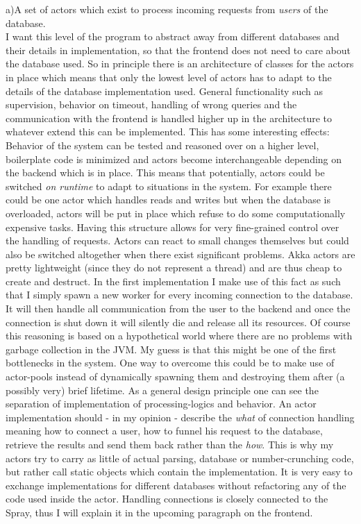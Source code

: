 \documentclass[11p]{scrartcl}
\begin{document}
a)A set of actors which exist to process incoming requests from \textit{users} of the database. \\

I want this level of the program to abstract away from different databases and their details in implementation, so that the frontend does not need to care about the database used.
So in principle there is an architecture of classes for the actors in place which means that only the lowest level of actors has to adapt to the details of the database implementation used. General functionality such as supervision, behavior on timeout, handling of wrong queries and the communication with the frontend is handled higher up in the architecture to whatever extend this can be implemented.
This has some interesting effects:
Behavior of the system can be tested and reasoned over on a higher level, boilerplate code is minimized and actors become interchangeable depending on the backend which is in place. This means that potentially, actors could be switched \textit{on runtime} to adapt to situations in the system. For example there could be one actor which handles reads and writes but when the database is overloaded, actors will be put in place which refuse to do some computationally expensive tasks. Having this structure allows for very fine-grained control over the handling of requests. Actors can react to small changes themselves but could also be switched altogether when there exist significant problems.
Akka actors are pretty lightweight (since they do not represent a thread) and are thus cheap to create and destruct. In the first implementation I make use of this fact as such that I simply spawn a new worker for every incoming connection to the database. It will then handle all communication from the user to the  backend  and once the connection is shut down it will silently die and release all its resources. Of course this reasoning is based on a hypothetical world where there are no problems with garbage collection in the JVM. My guess is that this might be one of the first bottlenecks in the system. One way to overcome this could be to make use of actor-pools instead of dynamically spawning them and destroying them after (a possibly very) brief lifetime.
As a general design principle one can see the separation of implementation of processing-logics and behavior. An actor implementation should - in my opinion - describe the \textit{what} of connection handling meaning how to connect a user, how to funnel his request to the database, retrieve the results and send them back rather than the \textit{how}. This is why my actors try to carry as little of actual parsing, database or number-crunching code, but rather call static objects which contain the implementation. It is very easy to exchange implementations for different databases without refactoring any of the code used inside the actor. Handling connections is closely connected to the Spray, thus I will explain it in the upcoming paragraph on the frontend.\\
\end{document}
